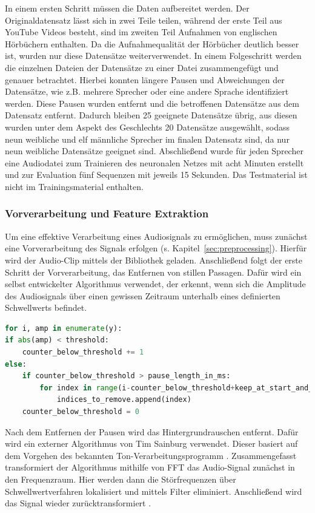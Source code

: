 In einem ersten Schritt müssen die Daten aufbereitet werden.
Der Originaldatensatz lässt sich in zwei Teile teilen, während der erste Teil aus YouTube Videos besteht, sind im zweiten Teil Aufnahmen von englischen Hörbüchern enthalten.
Da die Aufnahmequalität der Hörbücher deutlich besser ist, wurden nur diese Datensätze weiterverwendet.
In einem Folgeschritt werden die einzelnen Dateien der Datensätze zu einer Datei zusammengefügt und genauer betrachtet.
Hierbei konnten längere Pausen und Abweichungen der Datensätze, wie z.B. mehrere Sprecher oder eine andere Sprache identifiziert werden.
Diese Pausen wurden entfernt und die betroffenen Datensätze aus dem Datensatz entfernt.
Dadurch bleiben 25 geeignete Datensätze übrig, aus diesen wurden unter dem Aspekt des Geschlechts 20 Datensätze ausgewählt, sodass neun weibliche und elf männliche Sprecher im finalen Datensatz sind, da nur neun weibliche Datensätze geeignet sind.
Abschließend wurde für jeden Sprecher eine Audiodatei zum Trainieren des neuronalen Netzes mit acht Minuten erstellt und zur Evaluation fünf Sequenzen mit jeweils 15 Sekunden.
Das Testmaterial ist nicht im Trainingsmaterial enthalten.

\subsubsection{Vorverarbeitung und Feature Extraktion}

Um eine effektive Verarbeitung eines Audiosignals zu ermöglichen, muss zunächst eine Vorverarbeitung des Signals erfolgen (s. Kapitel~\ref{sec:preprocessing}).
Hierfür wird der Audio-Clip mittels der Bibliothek  geladen.
Anschließend folgt der erste Schritt der Vorverarbeitung, das Entfernen von stillen Passagen.
Dafür wird ein selbst entwickelter Algorithmus verwendet, der erkennt, wenn sich die Amplitude des Audiosignals über einen gewissen Zeitraum unterhalb eines definierten Schwellwerts befindet.

\begin{lstlisting}[language=Python,numbers=none,caption=Remove Silence,label=lst-remove-silence]
for i, amp in enumerate(y):
if abs(amp) < threshold:
    counter_below_threshold += 1
else:
    if counter_below_threshold > pause_length_in_ms:
        for index in range(i-counter_below_threshold+keep_at_start_and_end, i-keep_at_start_and_end):
            indices_to_remove.append(index)
    counter_below_threshold = 0
\end{lstlisting}

Nach dem Entfernen der Pausen wird das Hintergrundrauschen entfernt.
Dafür wird ein externer Algorithmus von Tim Sainburg verwendet.
Dieser basiert auf dem Vorgehen des bekannten Ton-Verarbeitungsprogramm .
Zusammengefasst transformiert der Algorithmus mithilfe von \ac{FFT} das Audio-Signal zunächst in den Frequenzraum.
Hier werden dann die Störfrequenzen über Schwellwertverfahren lokalisiert und mittels Filter eliminiert.
Anschließend wird das Signal wieder zurücktransformiert \autocite[][]{sainburg_timsainbnoisereduce_2019}.

